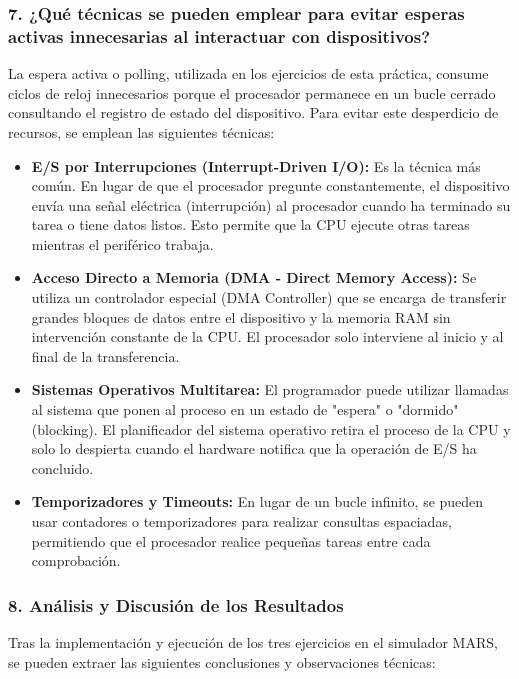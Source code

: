 \documentclass[12pt,a4paper]{article}
\begin{document}
\subsubsection{7. ¿Qué técnicas se pueden emplear para evitar esperas activas innecesarias al interactuar con dispositivos?}

La espera activa o polling, utilizada en los ejercicios de esta práctica, consume ciclos de reloj innecesarios porque el procesador permanece en un bucle cerrado consultando el registro de estado del dispositivo. Para evitar este desperdicio de recursos, se emplean las siguientes técnicas:
\begin{itemize}
    \item \textbf{E/S por Interrupciones (Interrupt-Driven I/O):} Es la técnica más común. En lugar de que el procesador pregunte constantemente, el dispositivo envía una señal eléctrica (interrupción) al procesador cuando ha terminado su tarea o tiene datos listos. Esto permite que la CPU ejecute otras tareas mientras el periférico trabaja.
    \item \textbf{Acceso Directo a Memoria (DMA - Direct Memory Access):} Se utiliza un controlador especial (DMA Controller) que se encarga de transferir grandes bloques de datos entre el dispositivo y la memoria RAM sin intervención constante de la CPU. El procesador solo interviene al inicio y al final de la transferencia.
    \item \textbf{Sistemas Operativos Multitarea:} El programador puede utilizar llamadas al sistema que ponen al proceso en un estado de "espera" o "dormido" (blocking). El planificador del sistema operativo retira el proceso de la CPU y solo lo despierta cuando el hardware notifica que la operación de E/S ha concluido.
    \item \textbf{Temporizadores y Timeouts:} En lugar de un bucle infinito, se pueden usar contadores o temporizadores para realizar consultas espaciadas, permitiendo que el procesador realice pequeñas tareas entre cada comprobación.
\end{itemize}

\subsubsection{8. Análisis y Discusión de los Resultados}

Tras la implementación y ejecución de los tres ejercicios en el simulador MARS, se pueden extraer las siguientes conclusiones y observaciones técnicas:
\end{document}
